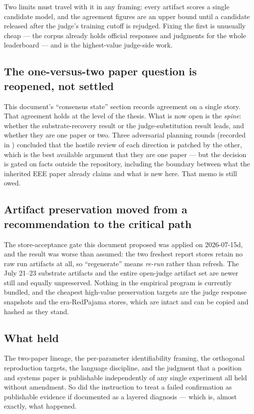 \documentclass[11pt]{article}
\newcommand{\code}[1]{\texttt{\detokenize{#1}}}
\begin{document}
Two limits must travel with it in any framing: every artifact scores a single
candidate model, and the agreement figures are an upper bound until a candidate
released after the judge's training cutoff is rejudged. Fixing the first is unusually
cheap --- the corpus already holds official responses and judgments for the whole
leaderboard --- and is the highest-value judge-side work.

\subsection{The one-versus-two paper question is reopened, not settled}

This document's ``consensus state'' section records agreement on a single story.
That agreement holds at the level of the thesis. What is now open is the
\emph{spine}: whether the substrate-recovery result or the judge-substitution result
leads, and whether they are one paper or two. Three adversarial planning rounds
(recorded in \code{docs/planning/tmlr-paper-thesis.md}) concluded that the hostile
review of each direction is patched by the other, which is the best available
argument that they are one paper --- but the decision is gated on facts outside the
repository, including the boundary between what the inherited EEE paper already
claims and what is new here. That memo is still owed.

\subsection{Artifact preservation moved from a recommendation to the critical path}

The store-acceptance gate this document proposed was applied on 2026-07-15d, and the
result was worse than assumed: the two freshest report stores retain no raw run
artifacts at all, so ``regenerate'' means \emph{re-run} rather than refresh. The
July 21--23 substrate artifacts and the entire open-judge artifact set are newer
still and equally unpreserved. Nothing in the empirical program is currently
bundled, and the cheapest high-value preservation targets are the judge response
snapshots and the era-RedPajama stores, which are intact and can be copied and
hashed as they stand.

\subsection{What held}

The two-paper lineage, the per-parameter identifiability framing, the orthogonal
reproduction targets, the language discipline, and the judgment that a position and
systems paper is publishable independently of any single experiment all held without
amendment. So did the instruction to treat a failed confirmation as publishable
evidence if documented as a layered diagnosis --- which is, almost exactly, what
happened.
\end{document}
